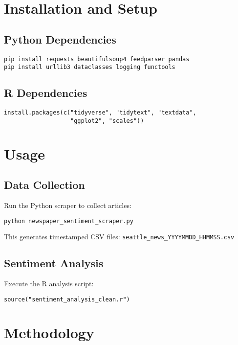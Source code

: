 \documentclass[11pt]{article}
\begin{document}
\section{Installation and Setup}

\subsection{Python Dependencies}

\begin{verbatim}
pip install requests beautifulsoup4 feedparser pandas
pip install urllib3 dataclasses logging functools
\end{verbatim}

\subsection{R Dependencies}

\begin{verbatim}
install.packages(c("tidyverse", "tidytext", "textdata", 
                   "ggplot2", "scales"))
\end{verbatim}

\section{Usage}

\subsection{Data Collection}

Run the Python scraper to collect articles:

\begin{verbatim}
python newspaper_sentiment_scraper.py
\end{verbatim}

This generates timestamped CSV files: \texttt{seattle\_news\_YYYYMMDD\_HHMMSS.csv}

\subsection{Sentiment Analysis}

Execute the R analysis script:

\begin{verbatim}
source("sentiment_analysis_clean.r")
\end{verbatim}

\section{Methodology}
\end{document}
